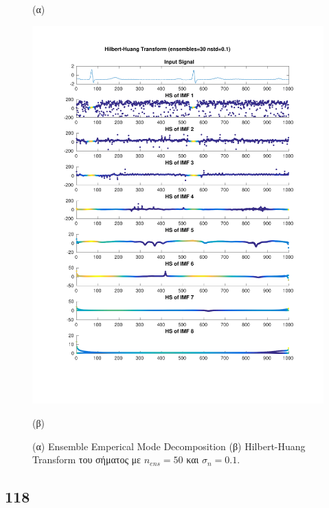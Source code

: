 \documentclass[11pt,a4paper]{article}
\begin{document}
\begin{figure}[H]
\begin{minipage}{0.48\textwidth}
	(α)
\end{minipage}
\begin{minipage}{0.48\textwidth}
	\centering
	\includegraphics[width=\textwidth]{fig/123l1_hht_ensemble.pdf}
	
	(β)
\end{minipage}
\vfill
\caption{(α) Ensemble Emperical Mode Decomposition (β) Hilbert-Huang Transform του σήματος με $n_{ens}=50$ και $\sigma_n = 0.1$.}
\label{fig:123l1_hht_ensemble}
\end{figure}

\subsection*{118}
\end{document}
